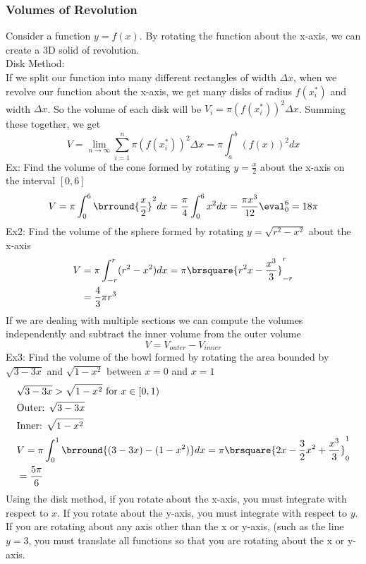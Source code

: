\subsubsection{Volumes of Revolution}
Consider a function $y=f(x)$. By rotating the function about the x-axis, we can create a 3D solid of revolution.\\
Disk Method:\\
If we split our function into many different rectangles of width $\Delta x$, when we revolve our function about the x-axis, we get many disks of radius $f(x_i^*)$ and width $\Delta x$. So the volume of each disk will be $V_i=\pi (f(x_i^*))^2\Delta x$. Summing these together, we get
$$V=\lim_{n\to \infty}\sum_{i=1}^n\pi(f(x_i^*))^2\Delta x=\pi\int_a^b(f(x))^2dx$$
Ex: Find the volume of the cone formed by rotating $y=\frac{x}{2}$ about the x-axis on the interval $[0,6]$
\begin{align*}
    V=\pi\int_0^6\brround{\frac{x}{2}}^2dx=\frac{\pi}{4}\int_0^6x^2dx={\frac{\pi x^3}{12}}\eval_0^6=18\pi
\end{align*}
Ex2: Find the volume of the sphere formed by rotating $y=\sqrt{r^2-x^2}$ about the x-axis
\begin{align*}
    V&=\pi\int_{-r}^r(r^2-x^2)dx=\pi\brsquare{r^2x-\frac{x^3}{3}}_{-r}^r\\
    &=\frac{4}{3}\pi r^3
\end{align*}
If we are dealing with multiple sections we can compute the volumes independently and subtract the inner volume from the outer volume
$$V=V_{outer}-V_{inner}$$
Ex3: Find the volume of the bowl formed by rotating the area bounded by $\sqrt{3-3x}$ and $\sqrt{1-x^2}$ between $x=0$ and $x=1$
\begin{align*}
    &\sqrt{3-3x}>\sqrt{1-x^2}\text{ for }x\in[0,1)\\
    &\text{Outer: }\sqrt{3-3x}\\
    &\text{Inner: }\sqrt{1-x^2}\\
    &V=\pi\int_0^1\brround{(3-3x)-(1-x^2)}dx=\pi\brsquare{2x-\frac{3}{2}x^2+\frac{x^3}{3}}_0^1\\
    &=\frac{5\pi}{6}
\end{align*}
Using the disk method, if you rotate about the x-axis, you must integrate with respect to $x$. If you rotate about the y-axis, you must integrate with respect to $y$.\\
If you are rotating about any axis other than the x or y-axis, (such as the line $y=3$, you must translate all functions so that you are rotating about the x or y-axis.\\
